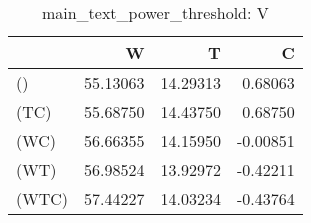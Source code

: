 \begin{table}
\centering
\caption{main_text_power_threshold: V}
\begin{tabular}{lrrr}
\toprule
{} &        W &        T &        C \\
\midrule
()    & 55.13063 & 14.29313 &  0.68063 \\
(TC)  & 55.68750 & 14.43750 &  0.68750 \\
(WC)  & 56.66355 & 14.15950 & -0.00851 \\
(WT)  & 56.98524 & 13.92972 & -0.42211 \\
(WTC) & 57.44227 & 14.03234 & -0.43764 \\
\bottomrule
\end{tabular}
\end{table}
